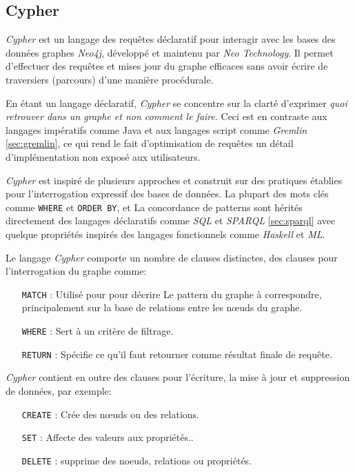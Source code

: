   \subsection{Cypher}
  \label{sec:cypher}
  \emph{Cypher} \cite{cypher-docs} est un langage des requêtes
  déclaratif pour interagir avec les bases des données graphes
  \emph{Neo4j}, développé et maintenu par \emph{Neo Technology}. Il
  permet d'effectuer des requêtes et mises jour du graphe efficaces
  sans avoir écrire de traversiers (parcours) d'une manière
  procédurale.\medskip

  En étant un langage déclaratif, \emph{Cypher} se concentre sur la
  clarté d'exprimer \textit{quoi retrouver dans un graphe et non
    comment le faire}. Ceci est en contraste aux langages impératifs
  comme Java et aux langages script comme \emph{Gremlin}
  \ref{sec:gremlin}, ce qui rend le fait d'optimisation de requêtes un
  détail d'implémentation non exposé aux utilisateurs.\medskip

  \emph{Cypher} est inspiré de plusieurs approches et construit sur
  des pratiques établies pour l'interrogation expressif des bases de
  données. La plupart des mots clés comme \verb|WHERE| et
  \verb|ORDER BY|, et La concordance de patterns sont hérités
  directement des langages déclaratifs comme \emph{SQL} et
  \emph{SPARQL} \ref{sec:sparql} avec quelque propriétés inspirés des
  langages fonctionnels comme \emph{Haskell} et \emph{ML}.\medskip

  Le langage \emph{Cypher} comporte un nombre de clauses distinctes,
  des clauses pour l'interrogation du graphe comme:
  \begin{itemize}
  \item [\texttt{MATCH}]: Utilisé pour pour décrire Le pattern du graphe
    à correspondre, principalement sur la base de relations entre les
    nœuds du graphe.
  \item [\texttt{WHERE}]: Sert à un critère de filtrage.
  \item [\texttt{RETURN}]: Spécifie ce qu'il faut retourner comme
    résultat finale de requête.
  \end{itemize}
  \medskip

  \emph{Cypher} contient en outre des clauses pour l'écriture, la mise
  à jour et suppression de données, par exemple:

  \begin{itemize}
  \item [\texttt{CREATE}]: Crée des nœuds ou des relations.
  \item [\texttt{SET}]: Affecte des valeurs aux propriétés..
  \item [\texttt{DELETE}]: supprime des noeuds, relations ou propriétés.
  \end{itemize}

